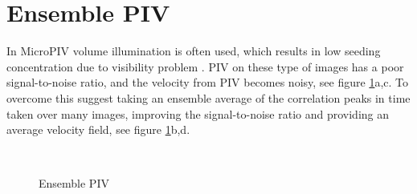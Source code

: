 \documentclass[10pt]{article}
\begin{document}
\section{Ensemble PIV}
In MicroPIV volume illumination is often used, which results in low seeding concentration due to visibility problem \citep{Olsen2000}.
PIV on these type of images has a poor signal-to-noise ratio, and the velocity from PIV becomes noisy, see figure \ref{fig:ensemble}a,c.
To overcome this \cite{Wereley2005} suggest taking an ensemble average of the correlation peaks in time taken over many images,
improving the signal-to-noise ratio and providing an average velocity field, see figure \ref{fig:ensemble}b,d.
%
\begin{figure}[ht]
  \label{fig:ensemble}
  \centering
  \vspace{.2cm} \hspace{.15\textwidth}
   \vspace{.2cm}\\ %
  \hspace{.15\textwidth} 
 \caption{Ensemble PIV}
\end{figure}
\end{document}
